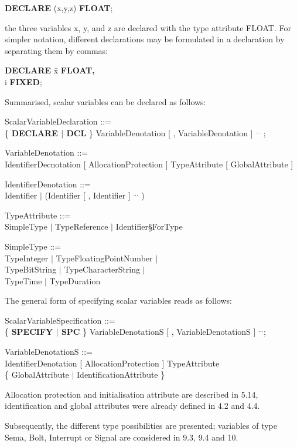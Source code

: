 {\bf DECLARE} (x,y,z) {\bf FLOAT};

the three variables x, y, and z are declared with the type attribute
FLOAT.  For simpler notation, different declarations may be formulated
in a declaration by separating them by commas:

\begin{tabbing}
{\bf DECLARE} \= x {\bf FLOAT,}\\
              \> i {\bf FIXED};
\end{tabbing}

Summarised, scalar variables can be declared as follows:

ScalarVariableDeclaration ::=\\
\x \{ {\bf DECLARE $\mid$ DCL} \} VariableDenotation [ , VariableDenotation ] $^{...}$ ;

VariableDenotation ::=\\
\x IdentifierDecnotation [ AllocationProtection ] TypeAttribute [ GlobalAttribute ]\\
\x [ InitialisationAttribute ]

IdentifierDenotation ::=\\
\x Identifier $\mid$ (Identifier [ , Identifier ] $^{...}$ )

TypeAttribute ::=\\
\x SimpleType $\mid$ TypeReference $\mid$ Identifier\S ForType

SimpleType ::=\\
\x TypeInteger $\mid$ TypeFloatingPointNumber $\mid$\\
\x TypeBitString $\mid$ TypeCharacterString $\mid$\\
\x TypeTime $\mid$ TypeDuration

The general form of specifying scalar variables reads as follows:

ScalarVariableSpecification ::=\\
\x \{ {\bf SPECIFY $\mid$ SPC} \} VariableDenotationS [ , VariableDenotationS ] $^{...}$;

VariableDenotationS ::=\\
\x IdentifierDenotation [ AllocationProtection ] TypeAttribute\\
\x \{ GlobalAttribute $\mid$ IdentificationAttribute \}

Allocation protection and initialisation attribute are described in 5.14,
identification and global attributes were already defined in 4.2 and
4.4.

Subsequently, the different type possibilities are presented; variables
of type Sema, Bolt, Interrupt or Signal are considered in 9.3, 9.4 and
10.

